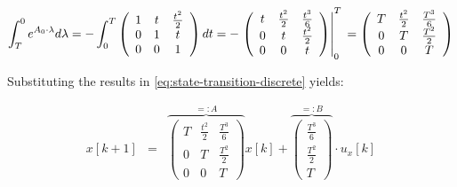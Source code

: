 \documentclass[english,ngerman]{KITreprt}
\begin{document}
\begin{equation}
\int^{0}_{T} e^{A_0 \cdot \lambda} d\lambda =  -\int^{T}_{0} \left(\begin{array}{ccc}1 & t & \frac{t^2}{2}\\0 & 1 & t\\ 0 & 0 & 1\end{array}\right) dt
                                            =  -\left.\left(\begin{array}{ccc} %
                                                          t & \frac{t^2}{2} & \frac{t^3}{6} \\ %
                                                          0 & t             & \frac{t^2}{2} \\ %
                                                          0 & 0             & t %
                                                 \end{array}\right)\right|_{0}^{T}\\
                                            =   \left(\begin{array}{ccc} %
                                                          T & \frac{t^2}{2} & \frac{T^3}{6} \\ %
                                                          0 & T             & \frac{T^2}{2} \\ %
                                                          0 & 0             & T %
                                                \end{array}\right)
\end{equation}

Substituting the results in \ref{eq:state-transition-discrete} yields:

\begin{eqnarray} \label{eq:state-transition-result}
x[k+1] & = &  \overbrace{\left(\begin{array}{ccc} %
                     T & \frac{t^2}{2} & \frac{T^3}{6} \\ %
                     0 & T             & \frac{T^2}{2} \\ %
                     0 & 0             & T %
               \end{array}\right)}^{=: A} x[k]
             + \overbrace{\left(\begin{array}{ccc} %
                      \frac{T^3}{6} \\ %
                      \frac{T^2}{2} \\ %
                      T %
               \end{array}\right)}^{=: B} \cdot u_x[k]
\end{eqnarray}
\end{document}

